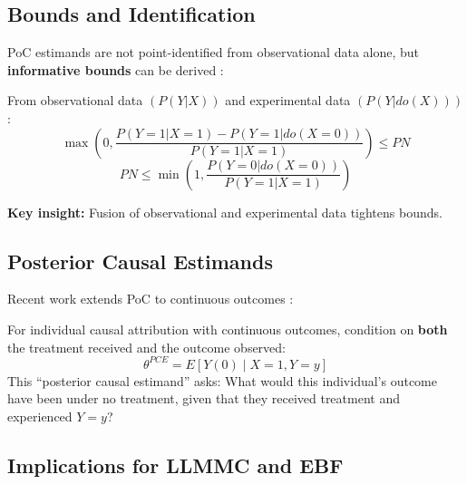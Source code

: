 \subsection{Bounds and Identification}

PoC estimands are not point-identified from observational data alone, but
\textbf{informative bounds} can be derived \citep{PAP-tian2000probabilities}:

\begin{tcolorbox}[colback=green!5!white, colframe=green!75!black,
    title=Tian-Pearl Bounds on PN]

From observational data $(P(Y|X))$ and experimental data $(P(Y|do(X)))$:
\[
\max\left(0, \frac{P(Y=1|X=1) - P(Y=1|do(X=0))}{P(Y=1|X=1)}\right) \leq PN
\]
\[
PN \leq \min\left(1, \frac{P(Y=0|do(X=0))}{P(Y=1|X=1)}\right)
\]

\textbf{Key insight:} Fusion of observational and experimental data tightens bounds.
\end{tcolorbox}

\subsection{Posterior Causal Estimands}

Recent work extends PoC to continuous outcomes \citep{PAP-luo2025attribution}:

\begin{tcolorbox}[colback=blue!5!white, colframe=blue!75!black,
    title=Axiom CAL-7: Posterior Causal Attribution (Luo-Geng Criterion)]
For individual causal attribution with continuous outcomes, condition on
\textbf{both} the treatment received and the outcome observed:
\[
\theta^{PCE} = E[Y(0) \mid X = 1, Y = y]
\]
This ``posterior causal estimand'' asks: What would this individual's outcome
have been under no treatment, given that they received treatment and experienced $Y=y$?
\end{tcolorbox}

\subsection{Implications for LLMMC and EBF}


